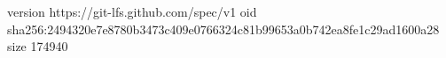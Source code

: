 version https://git-lfs.github.com/spec/v1
oid sha256:2494320e7e8780b3473c409e0766324c81b99653a0b742ea8fe1c29ad1600a28
size 174940
